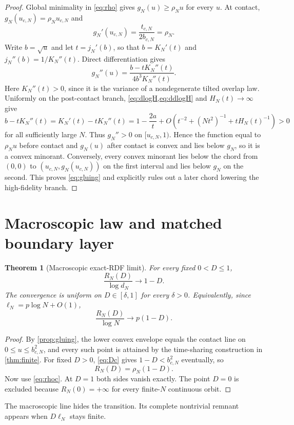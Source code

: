 \documentclass[11pt]{article}
\newtheorem{theorem}{Theorem}[section]
\begin{document}
\begin{proof}
Global minimality in \cref{eq:rho} gives
$g_N(u)\ge\rho_Nu$ for every $u$.  At contact,
$g_N(u_{c,N})=\rho_Nu_{c,N}$ and
\[
 g_N'(u_{c,N})=\frac{t_{c,N}}{2b_{c,N}}=\rho_N.
\]
Write $b=\sqrt u$ and let $t=j_N'(b)$, so that $b=K_N'(t)$ and
$j_N''(b)=1/K_N''(t)$.  Direct differentiation gives
\[
 g_N''(u)=\frac{b-tK_N''(t)}{4b^3K_N''(t)}.
\]
Here $K_N''(t)>0$, since it is the variance of a nondegenerate tilted overlap
law.  Uniformly on the post-contact branch, \cref{eq:dlogH,eq:ddlogH} and
$H_N(t)\to\infty$ give
\[
 b-tK_N''(t)
 =K_N'(t)-tK_N''(t)
 =1-\frac{2a}{t}
  +O\!\left(t^{-2}+(Nt^2)^{-1}+tH_N(t)^{-1}\right)>0
\]
for all sufficiently large $N$.  Thus $g_N''>0$ on $[u_{c,N},1)$.  Hence the function equal to $\rho_Nu$ before
contact and $g_N(u)$ after contact is convex and lies below $g_N$, so it is a
convex minorant.  Conversely, every convex minorant lies below the chord from
$(0,0)$ to $(u_{c,N},g_N(u_{c,N}))$ on the first interval and lies below
$g_N$ on the second.  This proves \cref{eq:gluing} and explicitly rules out a
later chord lowering the high-fidelity branch.
\end{proof}

\section{Macroscopic law and matched boundary layer}

\begin{theorem}[Macroscopic exact-RDF limit]
\label{thm:macro}
For every fixed $0<D\le1$,
\[
 \boxed{\frac{R_N(D)}{\log d_N}\longrightarrow1-D.}     \label{eq:macro}
\]
The convergence is uniform on $D\in[\delta,1]$ for every $\delta>0$.
Equivalently, since $\ell_N=p\log N+O(1)$,
\[
 \frac{R_N(D)}{\log N}\longrightarrow p(1-D).
\]
\end{theorem}

\begin{proof}
By \cref{prop:gluing}, the lower convex envelope equals the contact line on
$0\le u\le b_{c,N}^2$, and every such point is attained by the time-sharing
construction in \cref{thm:finite}.  For fixed $D>0$,
\cref{eq:Dc} gives $1-D<b_{c,N}^2$ eventually, so
\[
 R_N(D)=\rho_N(1-D).
\]
Now use \cref{eq:rhoc}.  At $D=1$ both sides vanish exactly.  The point
$D=0$ is excluded because $R_N(0)=+\infty$ for every finite-$N$ continuous
orbit.
\end{proof}

The macroscopic line hides the transition.  Its complete nontrivial remnant
appears when $D\ell_N$ stays finite.
\end{document}

